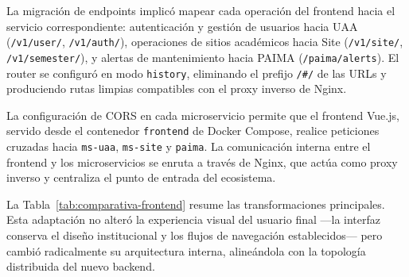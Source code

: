 La migración de endpoints implicó mapear cada operación del frontend hacia el
servicio correspondiente: autenticación y gestión de usuarios hacia UAA
(\texttt{/v1/user/}, \texttt{/v1/auth/}), operaciones de sitios académicos hacia Site
(\texttt{/v1/site/}, \texttt{/v1/semester/}), y alertas de mantenimiento hacia PAIMA
(\texttt{/paima/alerts}). El router se configuró en modo \texttt{history}, eliminando el
prefijo \texttt{/\#/} de las URLs y produciendo rutas limpias compatibles con el proxy
inverso de Nginx.

La configuración de CORS en cada microservicio permite que el frontend Vue.js,
servido desde el contenedor \texttt{frontend} de Docker Compose, realice peticiones
cruzadas hacia \texttt{ms-uaa}, \texttt{ms-site} y \texttt{paima}. La comunicación
interna entre el frontend y los microservicios se enruta a través de Nginx, que
actúa como proxy inverso y centraliza el punto de entrada del ecosistema.

\begin{table}[h!]
\centering
{}
\caption{\textit{Comparativa cualitativa: frontend monolítico vs. frontend adaptado}}
\label{tab:comparativa-frontend}
\end{table}

La Tabla~\ref{tab:comparativa-frontend} resume las transformaciones principales.
Esta adaptación no alteró la experiencia visual del usuario final ---la interfaz
conserva el diseño institucional y los flujos de navegación establecidos--- pero
cambió radicalmente su arquitectura interna, alineándola con la topología
distribuida del nuevo backend.
